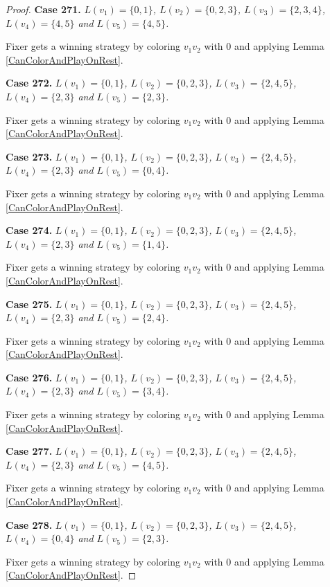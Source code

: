 \documentclass[12pt]{amsart}
\theoremstyle{plain}
\theoremstyle{definition}
\theoremstyle{remark}
\begin{document}
\begin{proof}
\noindent\textbf{Case 271.  }\textit{$L(v_1) = \{0, 1\}$, $L(v_2) = \{0, 2, 3\}$, $L(v_3) = \{2, 3, 4\}$, $L(v_4) = \{4, 5\}$ and $L(v_5) = \{4, 5\}$.}

Fixer gets a winning strategy by coloring $v_1v_2$ with $0$ and applying Lemma \ref{CanColorAndPlayOnRest}.

\noindent\textbf{Case 272.  }\textit{$L(v_1) = \{0, 1\}$, $L(v_2) = \{0, 2, 3\}$, $L(v_3) = \{2, 4, 5\}$, $L(v_4) = \{2, 3\}$ and $L(v_5) = \{2, 3\}$.}

Fixer gets a winning strategy by coloring $v_1v_2$ with $0$ and applying Lemma \ref{CanColorAndPlayOnRest}.

\noindent\textbf{Case 273.  }\textit{$L(v_1) = \{0, 1\}$, $L(v_2) = \{0, 2, 3\}$, $L(v_3) = \{2, 4, 5\}$, $L(v_4) = \{2, 3\}$ and $L(v_5) = \{0, 4\}$.}

Fixer gets a winning strategy by coloring $v_1v_2$ with $0$ and applying Lemma \ref{CanColorAndPlayOnRest}.

\noindent\textbf{Case 274.  }\textit{$L(v_1) = \{0, 1\}$, $L(v_2) = \{0, 2, 3\}$, $L(v_3) = \{2, 4, 5\}$, $L(v_4) = \{2, 3\}$ and $L(v_5) = \{1, 4\}$.}

Fixer gets a winning strategy by coloring $v_1v_2$ with $0$ and applying Lemma \ref{CanColorAndPlayOnRest}.

\noindent\textbf{Case 275.  }\textit{$L(v_1) = \{0, 1\}$, $L(v_2) = \{0, 2, 3\}$, $L(v_3) = \{2, 4, 5\}$, $L(v_4) = \{2, 3\}$ and $L(v_5) = \{2, 4\}$.}

Fixer gets a winning strategy by coloring $v_1v_2$ with $0$ and applying Lemma \ref{CanColorAndPlayOnRest}.

\noindent\textbf{Case 276.  }\textit{$L(v_1) = \{0, 1\}$, $L(v_2) = \{0, 2, 3\}$, $L(v_3) = \{2, 4, 5\}$, $L(v_4) = \{2, 3\}$ and $L(v_5) = \{3, 4\}$.}

Fixer gets a winning strategy by coloring $v_1v_2$ with $0$ and applying Lemma \ref{CanColorAndPlayOnRest}.

\noindent\textbf{Case 277.  }\textit{$L(v_1) = \{0, 1\}$, $L(v_2) = \{0, 2, 3\}$, $L(v_3) = \{2, 4, 5\}$, $L(v_4) = \{2, 3\}$ and $L(v_5) = \{4, 5\}$.}

Fixer gets a winning strategy by coloring $v_1v_2$ with $0$ and applying Lemma \ref{CanColorAndPlayOnRest}.

\noindent\textbf{Case 278.  }\textit{$L(v_1) = \{0, 1\}$, $L(v_2) = \{0, 2, 3\}$, $L(v_3) = \{2, 4, 5\}$, $L(v_4) = \{0, 4\}$ and $L(v_5) = \{2, 3\}$.}

Fixer gets a winning strategy by coloring $v_1v_2$ with $0$ and applying Lemma \ref{CanColorAndPlayOnRest}.


\end{proof}
\end{document}
